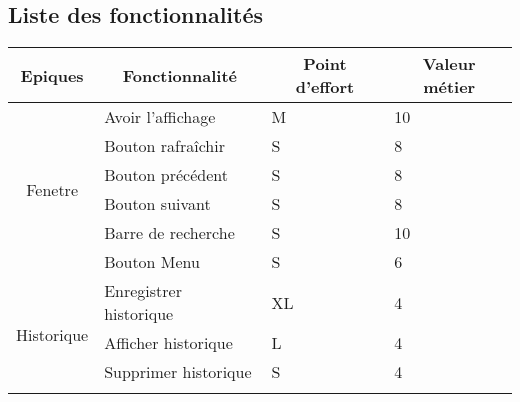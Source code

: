 \documentclass[10pt,a4paper]{article}
\begin{document}
\subsection{Liste des fonctionnalités}
\begin{table}[H]
\begin{tabular}{|c|l|l|l|}
\hline
\textbf{Epiques}                           & \multicolumn{1}{c|}{\textbf{Fonctionnalité}} & \multicolumn{1}{c|}{\textbf{Point d'effort}} & \multicolumn{1}{c|}{\textbf{Valeur métier}} \\ \hline
\multirow{6}{*}{Fenetre}                & Avoir l'affichage                            & M                                            & 10                                          \\ \cline{2-4} 
                                        & Bouton rafraîchir                            & S                                            & 8                                           \\ \cline{2-4} 
                                        & Bouton précédent                             & S                                            & 8                                           \\ \cline{2-4} 
                                        & Bouton suivant                               & S                                            & 8                                           \\ \cline{2-4} 
                                        & Barre de recherche                           & S                                            & 10                                          \\ \cline{2-4} 
                                        & Bouton Menu                                  & S                                            & 6                                           \\ \hline
\multirow{5}{*}{Historique}             & Enregistrer historique                       & XL                                           & 4                                           \\ \cline{2-4} 
                                        & Afficher historique                          & L                                            & 4                                           \\ \cline{2-4} 
                                        & Supprimer historique                         & S                                            & 4                                           \\ \cline{2-4} 

\end{tabular}
\end{table}
\end{document}
